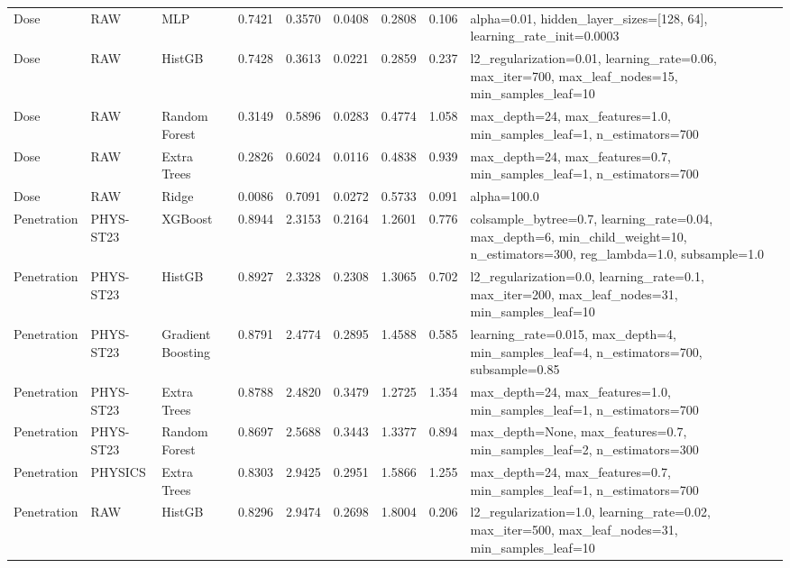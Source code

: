 \documentclass[11pt]{article}
\begin{document}
\begin{landscape}
\begin{longtable}{p{}p{}p{}rrrrrp{}}
Dose & RAW & MLP & 0.7421 & 0.3570 & 0.0408 & 0.2808 & 0.106 & \footnotesize\ttfamily alpha=0.01, hidden\_layer\_sizes=[128, 64], learning\_rate\_init=0.0003 \\
Dose & RAW & HistGB & 0.7428 & 0.3613 & 0.0221 & 0.2859 & 0.237 & \footnotesize\ttfamily l2\_regularization=0.01, learning\_rate=0.06, max\_iter=700, max\_leaf\_nodes=15, min\_samples\_leaf=10 \\
Dose & RAW & Random Forest & 0.3149 & 0.5896 & 0.0283 & 0.4774 & 1.058 & \footnotesize\ttfamily max\_depth=24, max\_features=1.0, min\_samples\_leaf=1, n\_estimators=700 \\
Dose & RAW & Extra Trees & 0.2826 & 0.6024 & 0.0116 & 0.4838 & 0.939 & \footnotesize\ttfamily max\_depth=24, max\_features=0.7, min\_samples\_leaf=1, n\_estimators=700 \\
Dose & RAW & Ridge & 0.0086 & 0.7091 & 0.0272 & 0.5733 & 0.091 & \footnotesize\ttfamily alpha=100.0 \\
Penetration & PHYS-ST23 & XGBoost & 0.8944 & 2.3153 & 0.2164 & 1.2601 & 0.776 & \footnotesize\ttfamily colsample\_bytree=0.7, learning\_rate=0.04, max\_depth=6, min\_child\_weight=10, n\_estimators=300, reg\_lambda=1.0, subsample=1.0 \\
Penetration & PHYS-ST23 & HistGB & 0.8927 & 2.3328 & 0.2308 & 1.3065 & 0.702 & \footnotesize\ttfamily l2\_regularization=0.0, learning\_rate=0.1, max\_iter=200, max\_leaf\_nodes=31, min\_samples\_leaf=10 \\
Penetration & PHYS-ST23 & Gradient Boosting & 0.8791 & 2.4774 & 0.2895 & 1.4588 & 0.585 & \footnotesize\ttfamily learning\_rate=0.015, max\_depth=4, min\_samples\_leaf=4, n\_estimators=700, subsample=0.85 \\
Penetration & PHYS-ST23 & Extra Trees & 0.8788 & 2.4820 & 0.3479 & 1.2725 & 1.354 & \footnotesize\ttfamily max\_depth=24, max\_features=1.0, min\_samples\_leaf=1, n\_estimators=700 \\
Penetration & PHYS-ST23 & Random Forest & 0.8697 & 2.5688 & 0.3443 & 1.3377 & 0.894 & \footnotesize\ttfamily max\_depth=None, max\_features=0.7, min\_samples\_leaf=2, n\_estimators=300 \\
Penetration & PHYSICS & Extra Trees & 0.8303 & 2.9425 & 0.2951 & 1.5866 & 1.255 & \footnotesize\ttfamily max\_depth=24, max\_features=0.7, min\_samples\_leaf=1, n\_estimators=700 \\
Penetration & RAW & HistGB & 0.8296 & 2.9474 & 0.2698 & 1.8004 & 0.206 & \footnotesize\ttfamily l2\_regularization=1.0, learning\_rate=0.02, max\_iter=500, max\_leaf\_nodes=31, min\_samples\_leaf=10 \\

\end{longtable}
\end{landscape}
\end{document}

